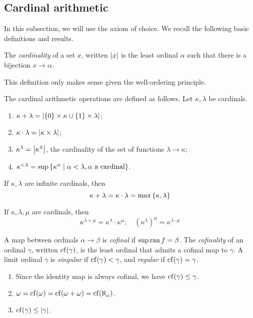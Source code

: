 \subsection{Cardinal arithmetic}
In this subsection, we will use the axiom of choice.
We recall the following basic definitions and results.
\begin{definition}
    The \emph{cardinality} of a set \( x \), written \( \abs{x} \) is the least ordinal \( \alpha \) such that there is a bijection \( x \to \alpha \).
\end{definition}
This definition only makes sense given the well-ordering principle.
\begin{definition}
    The cardinal arithmetic operations are defined as follows.
    Let \( \kappa, \lambda \) be cardinals.
    \begin{enumerate}
        \item \( \kappa + \lambda = \abs{\qty{0} \times \kappa \cup \qty{1} \times \lambda} \);
        \item \( \kappa \cdot \lambda = \abs{\kappa \times \lambda} \);
        \item \( \kappa^\lambda = \abs{\kappa^\lambda} \), the cardinality of the set of functions \( \lambda \to \kappa \);
        \item \( \kappa^{<\lambda} = \sup\qty{\kappa^\alpha \mid \alpha < \lambda, \alpha \text{ a cardinal}} \).
    \end{enumerate}
\end{definition}
\begin{theorem}[Hessenberg]
    If \( \kappa, \lambda \) are infinite cardinals, then
    \[ \kappa + \lambda = \kappa \cdot \lambda = \max\qty{\kappa, \lambda} \]
\end{theorem}
\begin{lemma}
    If \( \kappa, \lambda, \mu \) are cardinals, then
    \[ \kappa^{\lambda + \mu} = \kappa^\lambda \cdot \kappa^\mu;\quad (\kappa^\lambda)^\mu = \kappa^{\lambda \cdot \mu} \]
\end{lemma}
\begin{definition}
    A map between ordinals \( \alpha \to \beta \) is \emph{cofinal} if \( \sup \operatorname{ran} f = \beta \).
    The \emph{cofinality} of an ordinal \( \gamma \), written \( \operatorname{cf}(\gamma) \), is the least ordinal that admits a cofinal map to \( \gamma \).
    A limit ordinal \( \gamma \) is \emph{singular} if \( \operatorname{cf}(\gamma) < \gamma \), and \emph{regular} if \( \operatorname{cf}(\gamma) = \gamma \).
\end{definition}
\begin{remark}
    \begin{enumerate}
        \item Since the identity map is always cofinal, we have \( \operatorname{cf}(\gamma) \leq \gamma \).
        \item \( \omega = \operatorname{cf}(\omega) = \operatorname{cf}(\omega + \omega) = \operatorname{cf}(\aleph_\omega) \).
        \item \( \operatorname{cf}(\gamma) \leq \abs{\gamma} \).
    \end{enumerate}
\end{remark}
